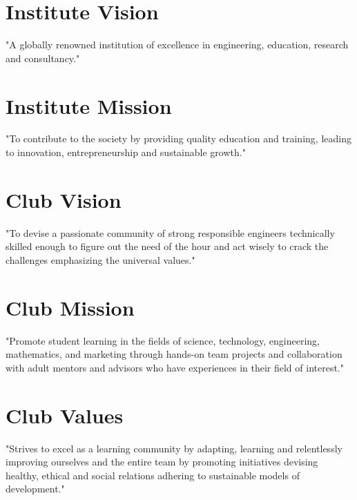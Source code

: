 \clearpage
\vspace*{\fill}
\begin{onehalfspace}
\begin{center} 
	\section*{Institute Vision}
	\begin{justify}
	"A globally renowned institution of excellence in engineering, education, research and consultancy."
	\end{justify}
			
	\section*{Institute Mission}
	\begin{justify}
	"To contribute to the society by providing quality education and training, leading to innovation, entrepreneurship and sustainable growth."
	\end{justify}
			
	\section*{Club Vision}
	\begin{justify}
	"To devise a passionate community of strong responsible engineers technically skilled enough to figure out the need of the hour and act wisely to crack the challenges emphasizing the universal values."
	\end{justify}
			
	\section*{Club Mission}
	\begin{justify}
	"Promote student learning in the fields of science, technology, engineering, mathematics, and marketing through hands-on team projects and collaboration with adult mentors and advisors who have experiences in their field of interest."
	\end{justify}

	\section*{Club Values}
	\begin{justify}
	"Strives to excel as a learning community by adapting, learning and relentlessly improving ourselves and the entire team by promoting initiatives devising healthy, ethical and social relations adhering to sustainable models of development."
	\end{justify}

\end{center}
\end{onehalfspace}
\vspace*{\fill}